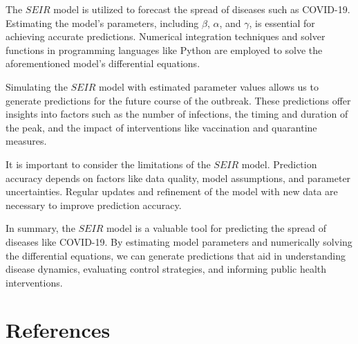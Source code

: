 \documentclass[13pt,a4paper]{report}
\begin{document}
\vspace{-0.8cm}

The $SEIR$ model is utilized to forecast the spread of diseases such as COVID-19. Estimating the model's parameters, including $\beta$, $\alpha$, and $\gamma$, is essential for achieving accurate predictions. Numerical integration techniques and solver functions in programming languages like Python are employed to solve the aforementioned model's differential equations.

Simulating the $SEIR$ model with estimated parameter values allows us to generate predictions for the future course of the outbreak. These predictions offer insights into factors such as the number of infections, the timing and duration of the peak, and the impact of interventions like vaccination and quarantine measures.

It is important to consider the limitations of the $SEIR$ model. Prediction accuracy depends on factors like data quality, model assumptions, and parameter uncertainties. Regular updates and refinement of the model with new data are necessary to improve prediction accuracy.

In summary, the $SEIR$ model is a valuable tool for predicting the spread of diseases like COVID-19. By estimating model parameters and numerically solving the differential equations, we can generate predictions that aid in understanding disease dynamics, evaluating control strategies, and informing public health interventions.

\newpage
\section{References}
\vspace{0.25cm}
    \begin{otherlanguage}{vietnamese}
        \nocite{*}%
        \printbibliography[heading=none]
    \end{otherlanguage}
\end{document}
